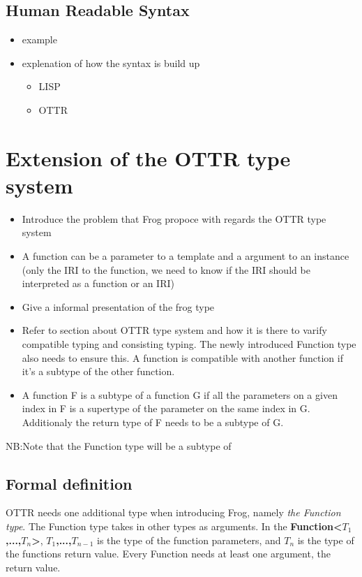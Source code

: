 \subsection{Human Readable Syntax}
\begin{itemize}
    \item example 
    \item explenation of how the syntax is build up
    \begin{itemize}
        \item LISP 
        \item OTTR 
    \end{itemize}
\end{itemize}

\section{Extension of the OTTR type system}
\begin{itemize}
    \item Introduce the problem that Frog propoce with regards the OTTR type system 
    \item A function can be a parameter to a template and a argument to an instance (only the IRI to the function, we need to know if the IRI should be interpreted as a function or an IRI)
    \item Give a informal presentation of the frog type 
    \item Refer to section about OTTR type system and how it is there to varify compatible typing and consisting typing. The newly introduced Function type also needs to ensure this. A function is compatible with  another function if it's a subtype of the other function.
    \item A function F is a subtype of a function G if all the parameters on a given index in F is a supertype of the parameter on the same index in G. Additionaly the return type of F needs to be a subtype of G.
\end{itemize}

NB:Note that the Function type will be a subtype of 

\subsection{Formal definition}
OTTR needs one additional type when introducing Frog, namely \emph{the Function type}. The Function type takes in other types as arguments. In the \textbf{Function<$T_1$,...,$T_n$>},\textbf{ $T_1$,...,$T_{n - 1}$} is the type of the function parameters, and \textbf{$T_n$} is the type of the functions return value. Every Function needs at least one argument, the return value. 

